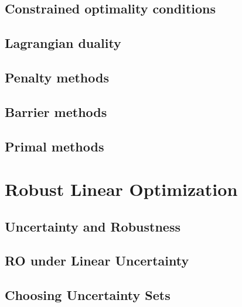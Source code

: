\documentclass{bookest}
\begin{document}
	\chapter{Constrained optimality conditions}
		
	
	\chapter{Lagrangian duality}
		
	
	\chapter{Penalty methods}
	
	
	\chapter{Barrier methods}
	
	
	\chapter{Primal methods}
	
	

	\part{Robust Linear Optimization}
	
	\chapter{Uncertainty and Robustness} \label{chapter_1}
	
	
	\chapter{RO under Linear Uncertainty} \label{chapter_2}
	
	
	\chapter{Choosing Uncertainty Sets} \label{chapter_3}
	
	
\end{document}
